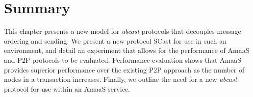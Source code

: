 \section{Summary}
This chapter presents a new model for \emph{abcast} protocols that decouples message ordering and sending.  We present a new protocol \textsf{SCast} for use in such an environment, and detail an experiment that allows for the performance of \textsf{AmaaS} and P2P protocols to be evaluated.  Performance evaluation shows that \textsf{AmaaS} provides superior performance over the existing P2P approach as the number of nodes in a transaction increases.  Finally, we outline the need for a new \emph{abcast} protocol for use within an \textsf{AmaaS} service. 